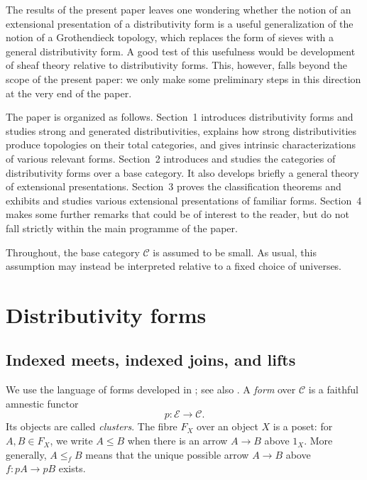 \documentclass[12pt,oneside,reqno]{amsart}
\theoremstyle{definition}
\theoremstyle{remark}
\newcommand{\C}{\mathcal C}
\begin{document}
The results of the present paper leaves one wondering whether the notion of an extensional presentation of a distributivity form is a useful generalization of the notion of a Grothendieck topology, which replaces the form of sieves with a general distributivity form. A good test of this usefulness would be development of sheaf theory relative to distributivity forms. This, however, falls beyond the scope of the present paper: we only make some preliminary steps in this direction at the very end of the paper.

The paper is organized as follows.  Section~1 introduces distributivity
forms and
studies strong and generated distributivities, explains how strong
distributivities produce topologies on their total categories, and gives
intrinsic characterizations of various relevant forms.  Section~2 introduces and studies the categories of distributivity forms over a base category. It also develops briefly a general theory of extensional
presentations. Section~3
proves the classification theorems and exhibits and studies various extensional presentations of familiar forms.
Section~4 makes some further remarks that could be of interest to the reader, but do not fall strictly within the main programme of the paper.

Throughout, the base category \(\C\) is assumed to be small.  As usual,
this assumption may instead be interpreted relative to a fixed choice
of universes.

\begingroup
\footnotesize
\tableofcontents
\endgroup

\section{Distributivity forms}
\label{sec:distributivity-forms}

\subsection{Indexed meets, indexed joins, and lifts}

We use the language of forms developed in
\cite{JanelidzeWeighillI,JanelidzeWeighillII}; see also
\cite{DuckertsAntoineGranJanelidze,JanelidzeVanNiekerk}.  A
\emph{form} over \(\C\) is a faithful amnestic functor
\[
                         p:\mathcal E\longrightarrow\C.
\]
Its objects are called \emph{clusters}.  The fibre \(F_X\) over an
object \(X\) is a poset: for \(A,B\in F_X\), we write \(A\leqslant B\)
when there is an arrow \(A\to B\) above \(1_X\).  More generally,
\(A\leqslant_fB\) means that the unique possible arrow \(A\to B\)
above \(f:pA\to pB\) exists.
\end{document}
